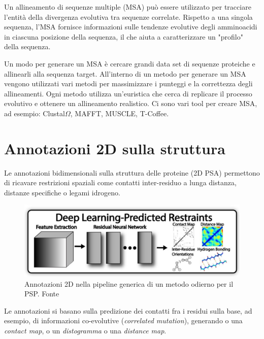 {	\par Un allineamento di sequenze multiple (MSA) può essere utilizzato per tracciare l'entità della divergenza evolutiva tra sequenze correlate. Rispetto a una singola sequenza, l'MSA fornisce informazioni sulle tendenze evolutive degli amminoacidi in ciascuna posizione della sequenza, il che aiuta a caratterizzare un "profilo" della sequenza.
	
	\par Un modo per generare un MSA è cercare grandi data set di sequenze proteiche e allinearli alla sequenza target. All'interno di un metodo per generare un MSA vengono utilizzati vari metodi per massimizzare i punteggi e la correttezza degli allineamenti.  Ogni metodo utilizza un'euristica che cerca di replicare il processo evolutivo e ottenere un allineamento realistico.	Ci sono vari tool per creare MSA, ad esempio: Clustal$\Omega$, MAFFT, MUSCLE, T-Coffee.
}

\section{Annotazioni 2D sulla struttura}

Le annotazioni bidimensionali sulla struttura delle proteine (2D PSA) permettono di ricavare restrizioni spaziali come contatti inter-residuo a lunga distanza, distanze specifiche o legami idrogeno. 

\begin{figure}[!htb]
	\centering
	\includegraphics[scale=1.5]{images/2dpsa.png}
	\caption{Annotazioni 2D nella pipeline generica di un metodo odierno per il PSP. Fonte\cite{pearce2021deep}}
	\label{fig:2dpsa}
\end{figure}

Le annotazioni si basano sulla predizione dei contatti fra i residui sulla base, ad esempio, di informazioni co-evolutive (\textit{correlated mutation}), generando o una \textit{contact map}, o un \textit{distogramma} o una \textit{distance map}. 

